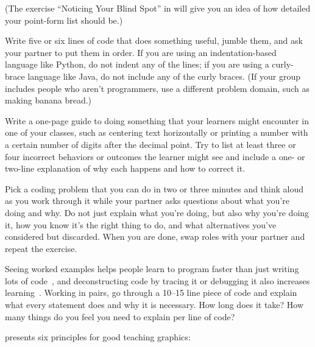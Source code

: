 (The exercise ``Noticing Your Blind Spot'' in 
will give you an idea of how detailed your point-form list should be.)


Write five or six lines of code that does something useful,
jumble them,
and ask your partner to put them in order.
If you are using an indentation-based language like Python,
do not indent any of the lines;
if you are using a curly-brace language like Java,
do not include any of the curly braces.
(If your group includes people who aren't programmers,
use a different problem domain,
such as making banana bread.)


Write a one-page guide to doing something that your learners might encounter in one of your classes,
such as centering text horizontally
or printing a number with a certain number of digits after the decimal point.
Try to list at least three or four incorrect behaviors or outcomes the learner might see
and include a one- or two-line explanation
of why each happens and how to correct it.


Pick a coding problem that you can do in two or three minutes
and think aloud as you work through it
while your partner asks questions about what you're doing and why.
Do not just explain what you're doing,
but also why you're doing it,
how you know it's the right thing to do,
and what alternatives you've considered but discarded.
When you are done,
swap roles with your partner and repeat the exercise.


Seeing worked examples helps people learn to program faster than just writing lots of code~\cite{Skud2014},
and deconstructing code by tracing it or debugging it also increases learning~\cite{Grif2016}.
Working in pairs,
go through a 10--15 line piece of code and explain what every statement does
and why it is necessary.
How long does it take?
How many things do you feel you need to explain per line of code?


\cite{Maye2009,Mill2016a} presents six principles for good teaching graphics:

